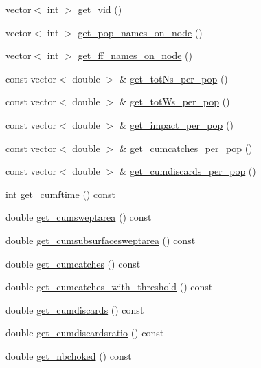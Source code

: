 \begin{DoxyCompactItemize}
\item 
vector$<$ int $>$ \mbox{\hyperlink{class_node_a24e980d4af18f208515d4b597362ddd7}{get\+\_\+vid}} ()
\item 
vector$<$ int $>$ \mbox{\hyperlink{class_node_a3c31783e7f69f7338be5aab52ab10f4d}{get\+\_\+pop\+\_\+names\+\_\+on\+\_\+node}} ()
\item 
vector$<$ int $>$ \mbox{\hyperlink{class_node_adc251dd184fadf1e4460bd1be0df07a3}{get\+\_\+ff\+\_\+names\+\_\+on\+\_\+node}} ()
\item 
const vector$<$ double $>$ \& \mbox{\hyperlink{class_node_a8e0f7d5b6e585c9890c8b011f1ad9817}{get\+\_\+tot\+Ns\+\_\+per\+\_\+pop}} ()
\item 
const vector$<$ double $>$ \& \mbox{\hyperlink{class_node_aec476404f336f54ea258dc70f07674aa}{get\+\_\+tot\+Ws\+\_\+per\+\_\+pop}} ()
\item 
const vector$<$ double $>$ \& \mbox{\hyperlink{class_node_a33d7128083c22b1aff22e81149fc8821}{get\+\_\+impact\+\_\+per\+\_\+pop}} ()
\item 
const vector$<$ double $>$ \& \mbox{\hyperlink{class_node_a37c67fea395e7b2a4f0667b7e6df20df}{get\+\_\+cumcatches\+\_\+per\+\_\+pop}} ()
\item 
const vector$<$ double $>$ \& \mbox{\hyperlink{class_node_afe99b34019a6b5f39e92df5bb3138f28}{get\+\_\+cumdiscards\+\_\+per\+\_\+pop}} ()
\item 
int \mbox{\hyperlink{class_node_a349c14569cdd3f3b9ac6fd266d15cf0d}{get\+\_\+cumftime}} () const
\item 
double \mbox{\hyperlink{class_node_a042cbd851c706cd16498c8bd1754a7f3}{get\+\_\+cumsweptarea}} () const
\item 
double \mbox{\hyperlink{class_node_a845670749959d4c932a8bbb4be78ffe8}{get\+\_\+cumsubsurfacesweptarea}} () const
\item 
double \mbox{\hyperlink{class_node_af91e2d83d46231119a54b9a800567fc9}{get\+\_\+cumcatches}} () const
\item 
double \mbox{\hyperlink{class_node_ab033cc01227c102414f8c0cc9431bbc8}{get\+\_\+cumcatches\+\_\+with\+\_\+threshold}} () const
\item 
double \mbox{\hyperlink{class_node_ad51b6af7a2e1ecac96d39ce2cbe4f0f9}{get\+\_\+cumdiscards}} () const
\item 
double \mbox{\hyperlink{class_node_afb29c4e3c3d6045bc2199fbac542c5bf}{get\+\_\+cumdiscardsratio}} () const
\item 
double \mbox{\hyperlink{class_node_a0c3328627d09b544fb4df912fd64cc02}{get\+\_\+nbchoked}} () const

\end{DoxyCompactItemize}

